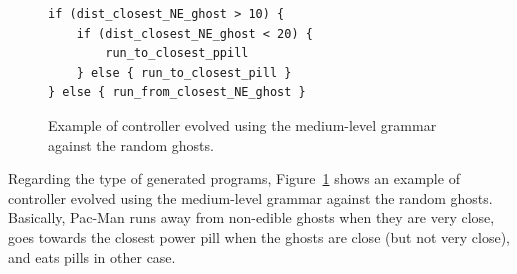 \documentclass{llncs}
\newcommand{\paco}{Pac-Man }
\begin{document}
\begin{figure}[tb]
	\centering
\begin{lstlisting}[frame=single, breaklines=false, basicstyle=\fontsize{10}{11}\ttfamily]
if (dist_closest_NE_ghost > 10) {
    if (dist_closest_NE_ghost < 20) { 
    	run_to_closest_ppill 
    } else { run_to_closest_pill }
} else { run_from_closest_NE_ghost }
\end{lstlisting} %
	\caption{Example of controller evolved using the medium-level grammar against the random ghosts.}
	\label{fig:program}
\end{figure}

Regarding the type of generated programs, Figure~\ref{fig:program} shows an example of controller evolved using the medium-level grammar against the random ghosts. Basically, \paco runs away from non-edible ghosts when they are very close, goes towards the closest power pill when the ghosts are close (but not very close), and eats pills in other case.

%
\end{document}
